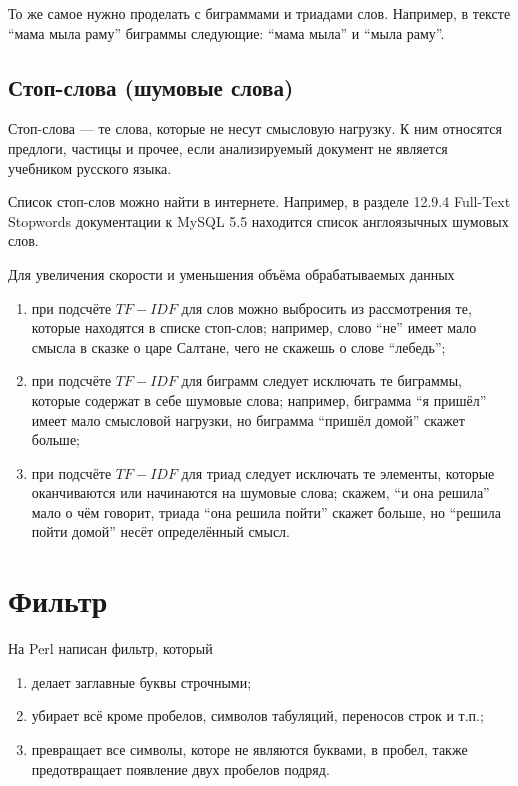 То же самое нужно проделать с биграммами и триадами слов.
Например, в тексте ``мама мыла раму'' биграммы следующие:
``мама мыла'' и ``мыла раму''.

\subsection{Стоп-слова (шумовые слова)}
Стоп-слова --- те слова, которые не несут смысловую нагрузку.
К ним относятся предлоги, частицы и прочее,
если анализируемый документ не является учебником русского языка.

Список стоп-слов можно найти в интернете.
Например, в разделе 12.9.4 Full-Text Stopwords документации к MySQL 5.5
находится список англоязычных шумовых слов.

Для увеличения скорости и уменьшения объёма обрабатываемых данных
\begin{enumerate}
  \item
    при подсчёте $TF-IDF$ для слов можно выбросить из рассмотрения те,
    которые находятся в списке стоп-слов;
    например, слово ``не'' имеет мало смысла в сказке о царе Салтане,
    чего не скажешь о слове ``лебедь'';
  \item
    при подсчёте $TF-IDF$ для биграмм следует исключать те биграммы,
    которые содержат в себе шумовые слова;
    например, биграмма ``я пришёл'' имеет мало смысловой нагрузки,
    но биграмма ``пришёл домой'' скажет больше;
  \item
    при подсчёте $TF-IDF$ для триад следует исключать те элементы,
    которые оканчиваются или начинаются на шумовые слова;
    скажем, ``и она решила'' мало о чём говорит,
    триада ``она решила пойти'' скажет больше,
    но ``решила пойти домой'' несёт определённый смысл.
\end{enumerate}

\section{Фильтр}
На Perl написан фильтр, который
\begin{enumerate}
  \item делает заглавные буквы строчными;
  \item убирает всё кроме пробелов, символов табуляций, переносов строк и т.п.;
  \item превращает все символы, которе не являются буквами, в пробел, также
    предотвращает появление двух пробелов подряд.
\end{enumerate}

